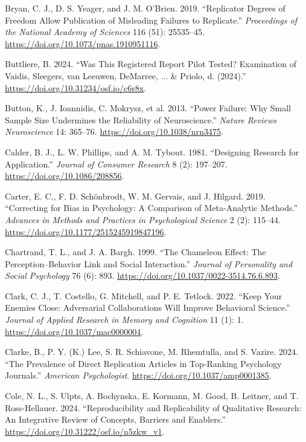 \documentclass[
  letterpaper,
  DIV=11,
  openany,
  fontsize=12pt,
  parskip=half,
  headings=big,
  numbers=noenddot,
  titlepage=false]{scrreprt}
\newlength{\cslhangindent}
\newenvironment{CSLReferences}[2] %
 {\begin{list}{}{%
  \setlength{\itemindent}{0pt}
  \setlength{\leftmargin}{0pt}
  \setlength{\parsep}{0pt}
  \ifodd #1
   \setlength{\leftmargin}{\cslhangindent}
   \setlength{\itemindent}{-1\cslhangindent}
  \fi
  \setlength{\itemsep}{#2\baselineskip}}}
 {\end{list}}
\begin{document}
\begin{CSLReferences}{1}{0}
Bryan, C. J., D. S. Yeager, and J. M. O'Brien. 2019. {``Replicator
Degrees of Freedom Allow Publication of Misleading Failures to
Replicate.''} \emph{Proceedings of the National Academy of Sciences} 116
(51): 25535--45. \url{https://doi.org/10.1073/pnas.1910951116}.

Buttliere, B. 2024. {``Was This Registered Report Pilot Tested?
Examination of Vaidis, Sleegers, van Leeuwen, DeMarree, ... \& Priolo,
d. (2024).''} \url{https://doi.org/10.31234/osf.io/c6r8x}.

Button, K., J. Ioannidis, C. Mokrysz, et al. 2013. {``Power Failure: Why
Small Sample Size Undermines the Reliability of Neuroscience.''}
\emph{Nature Reviews Neuroscience} 14: 365--76.
\url{https://doi.org/10.1038/nrn3475}.

Calder, B. J., L. W. Phillips, and A. M. Tybout. 1981. {``Designing
Research for Application.''} \emph{Journal of Consumer Research} 8 (2):
197--207. \url{https://doi.org/10.1086/208856}.

Carter, E. C., F. D. Schönbrodt, W. M. Gervais, and J. Hilgard. 2019.
{``Correcting for Bias in Psychology: A Comparison of Meta-Analytic
Methods.''} \emph{Advances in Methods and Practices in Psychological
Science} 2 (2): 115--44. \url{https://doi.org/10.1177/2515245919847196}.

Chartrand, T. L., and J. A. Bargh. 1999. {``The Chameleon Effect: The
Perception--Behavior Link and Social Interaction.''} \emph{Journal of
Personality and Social Psychology} 76 (6): 893.
\url{https://doi.org/10.1037/0022-3514.76.6.893}.

Clark, C. J., T. Costello, G. Mitchell, and P. E. Tetlock. 2022. {``Keep
Your Enemies Close: Adversarial Collaborations Will Improve Behavioral
Science.''} \emph{Journal of Applied Research in Memory and Cognition}
11 (1): 1. \url{https://doi.org/10.1037/mac0000004}.

Clarke, B., P. Y. (K.) Lee, S. R. Schiavone, M. Rhemtulla, and S.
Vazire. 2024. {``The Prevalence of Direct Replication Articles in
Top-Ranking Psychology Journals.''} \emph{American Psychologist}.
\url{https://doi.org/10.1037/amp0001385}.

Cole, N. L., S. Ulpts, A. Bochynska, E. Kormann, M. Good, B. Leitner,
and T. Ross-Hellauer. 2024. {``Reproducibility and Replicability of
Qualitative Research: An Integrative Review of Concepts, Barriers and
Enablers.''} \url{https://doi.org/10.31222/osf.io/n5zkw_v1}.


\end{CSLReferences}
\end{document}
